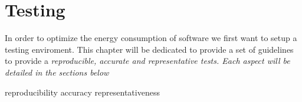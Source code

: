 \newpage
\chapter{Testing}
\label{chapter:testing}

In order to optimize the energy consumption of software we first want to setup a testing enviroment. This chapter will be dedicated to provide a set of guidelines to provide a \em{reproducible, accurate} and \em{representative} tests.
Each aspect will be detailed in the sections below

{reproducibility}
{accuracy}
{representativeness}
